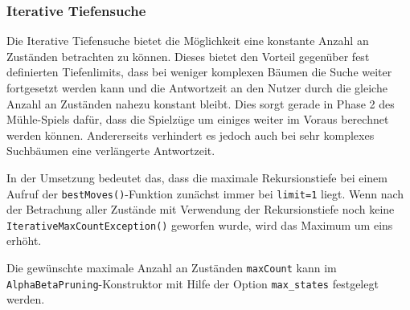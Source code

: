 \documentclass[11pt]{article}
\begin{document}
    \hypertarget{iterative-tiefensuche}{%
\subsubsection{Iterative Tiefensuche}\label{iterative-tiefensuche}}

Die Iterative Tiefensuche bietet die Möglichkeit eine konstante Anzahl
an Zuständen betrachten zu können. Dieses bietet den Vorteil gegenüber
fest definierten Tiefenlimits, dass bei weniger komplexen Bäumen die
Suche weiter fortgesetzt werden kann und die Antwortzeit an den Nutzer
durch die gleiche Anzahl an Zuständen nahezu konstant bleibt. Dies sorgt
gerade in Phase 2 des Mühle-Spiels dafür, dass die Spielzüge um einiges
weiter im Voraus berechnet werden können. Andererseits verhindert es
jedoch auch bei sehr komplexes Suchbäumen eine verlängerte Antwortzeit.

In der Umsetzung bedeutet das, dass die maximale Rekursionstiefe bei
einem Aufruf der \texttt{bestMoves()}-Funktion zunächst immer bei
\texttt{limit=1} liegt. Wenn nach der Betrachung aller Zustände mit
Verwendung der Rekursionstiefe noch keine
\texttt{IterativeMaxCountException()} geworfen wurde, wird das Maximum
um eins erhöht.

Die gewünschte maximale Anzahl an Zuständen \texttt{maxCount} kann im
\texttt{AlphaBetaPruning}-Konstruktor mit Hilfe der Option
\texttt{max\_states} festgelegt werden.
\end{document}
